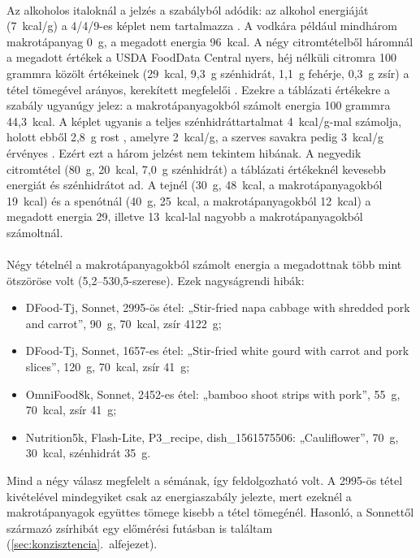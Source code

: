 \paragraph{}Az alkoholos italoknál a jelzés a szabályból adódik: az alkohol energiáját 
(7~kcal/g) a 4/4/9-es képlet nem tartalmazza \cite{fao2003foodenergy}. A vodkára például 
mindhárom makrotápanyag 0~g, a megadott energia 96~kcal. A négy citromtételből háromnál a 
megadott értékek a USDA FoodData Central nyers, héj nélküli citromra 100 grammra közölt 
értékeinek (29~kcal, 9,3~g szénhidrát, 1,1~g fehérje, 0,3~g zsír) a tétel tömegével arányos, 
kerekített megfelelői \cite{usda_fdc_lemon}. Ezekre a táblázati értékekre a szabály 
ugyanúgy jelez: a makrotápanyagokból számolt energia 100 grammra 44,3~kcal. A képlet ugyanis 
a teljes szénhidráttartalmat 4~kcal/g-mal számolja, holott ebből 2,8~g rost 
\cite{usda_fdc_lemon}, amelyre 2~kcal/g, a szerves savakra pedig 3~kcal/g érvényes 
\cite{fao2003foodenergy}. Ezért ezt a három jelzést nem tekintem hibának. A negyedik 
citromtétel (80~g, 20~kcal, 7,0~g szénhidrát) a táblázati értékeknél kevesebb energiát és 
szénhidrátot ad. A tejnél (30~g, 48~kcal, a makrotápanyagokból 19~kcal) és a spenótnál (40~g, 
25~kcal, a makrotápanyagokból 12~kcal) a megadott energia 29, illetve 13~kcal-lal 
nagyobb a makrotápanyagokból számoltnál.

\paragraph{}Négy tételnél a makrotápanyagokból számolt energia a megadottnak több mint 
ötszöröse volt (5,2--530,5-szerese). Ezek nagyságrendi hibák:
\begin{itemize}
    \item DFood-Tj, Sonnet, 2995-ös étel: „Stir-fried napa cabbage with shredded pork and carrot”, 90~g, 70~kcal, zsír 4122~g;
    \item DFood-Tj, Sonnet, 1657-es étel: „Stir-fried white gourd with carrot and pork slices”, 120~g, 70~kcal, zsír 41~g;
    \item OmniFood8k, Sonnet, 2452-es étel: „bamboo shoot strips with pork”, 55~g, 70~kcal, zsír 41~g;
    \item Nutrition5k, Flash-Lite, P3\_recipe, dish\_1561575506: „Cauliflower”, 70~g, 30~kcal, szénhidrát 35~g.
\end{itemize}
Mind a négy válasz megfelelt a sémának, így feldolgozható volt. A 2995-ös tétel kivételével 
mindegyiket csak az energiaszabály jelezte, mert ezeknél a makrotápanyagok együttes 
tömege kisebb a tétel tömegénél. 
Hasonló, a Sonnettől származó zsírhibát egy előmérési futásban is találtam 
(\ref{sec:konzisztencia}.~alfejezet).

